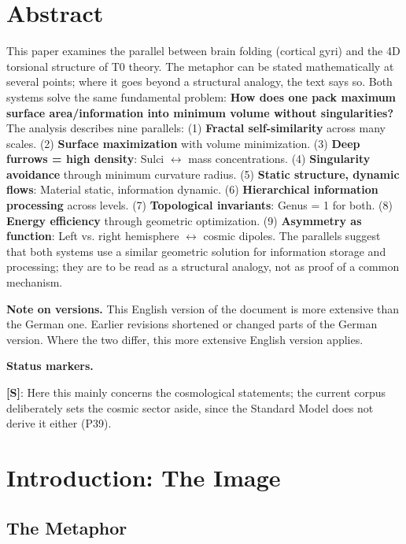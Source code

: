 \section*{Abstract}
		This paper examines the parallel between brain folding (cortical gyri) and the 4D torsional structure of T0 theory. The metaphor can be stated mathematically at several points; where it goes beyond a structural analogy, the text says so. Both systems solve the same fundamental problem: \textbf{How does one pack maximum surface area/information into minimum volume without singularities?} The analysis describes nine parallels: (1) \textbf{Fractal self-similarity} across many scales. (2) \textbf{Surface maximization} with volume minimization. (3) \textbf{Deep furrows = high density}: Sulci $\leftrightarrow$ mass concentrations. (4) \textbf{Singularity avoidance} through minimum curvature radius. (5) \textbf{Static structure, dynamic flows}: Material static, information dynamic. (6) \textbf{Hierarchical information processing} across levels. (7) \textbf{Topological invariants}: Genus = 1 for both. (8) \textbf{Energy efficiency} through geometric optimization. (9) \textbf{Asymmetry as function}: Left vs. right hemisphere $\leftrightarrow$ cosmic dipoles. The parallels suggest that both systems use a similar geometric solution for information storage and processing; they are to be read as a structural analogy, not as proof of a common mechanism.

	\medskip\noindent\textbf{Note on versions.} This English version of the document is more extensive than the German one. Earlier revisions shortened or changed parts of the German version. Where the two differ, this more extensive English version applies.


	\medskip\noindent\textbf{Status markers.}
	

	\noindent \textbf{[S]}: Here this mainly concerns the cosmological statements; the current corpus deliberately sets the cosmic sector aside, since the Standard Model does not derive it either (P39).




	\section{Introduction: The Image}

	\subsection{The Metaphor}

